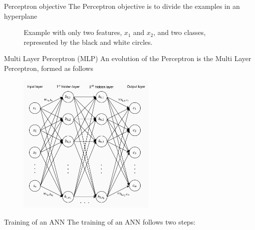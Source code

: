 \documentclass[xcolor={usenames}]{beamer}
\begin{document}
  \begin{frame}{Perceptron objective}
  	The Perceptron objective is to divide the examples in an hyperplane
  	\begin{figure}[t!]
		\centering		
		
		\caption{Example with only two features, $x_1$ and $x_2$, and two classes, represented by the black and white circles.}
		
	\end{figure}
  \end{frame}
  \begin{frame}{Multi Layer Perceptron (MLP)}
  	An evolution of the Perceptron is the Multi Layer Perceptron, formed as follows
  	\begin{figure}[t]
		\centering
		\includegraphics[width=0.6\textwidth]{../figures/multi-layer-perceptron.png}
	\end{figure}	
  \end{frame}
  \begin{frame}{Training of an ANN}
  	The training of an ANN follows two steps:
  	\begin{itemize}
  	\end{itemize}
  \end{frame}
\end{document}
